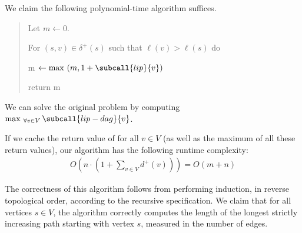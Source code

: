 \documentclass{article}
\begin{document}
\begin{solution}
We claim the following polynomial-time algorithm suffices.

\begin{quote}%


\begin{steps}
  \item Let \( m \leftarrow 0 \).
  \item For \( (s,v)\in \delta^+(s) \) such that \( \ell(v) > \ell(s) \) do
    \begin{steps}
        \item m \( \leftarrow \max \ (m, 1 + \subcall{lip}{v}) \)
    \end{steps}
  \item return m
\end{steps}
\end{quote}

We can solve the original problem by computing \(\max_{ \ \forall v\in V}\subcall{lip-dag}{v}\).

\begin{subproof}[Runtime]
If we cache the return value of  for all \( v \in V \) (as well as the maximum of all these return values), our algorithm has the following runtime complexity:
\begin{align*}
    O \left( n \cdot \left( 1+\sum_{v\in V} d^+(v) \right) \right) = O \left( m+n \right)
\end{align*}


\end{subproof}

\begin{subproof}[Correctness]
The correctness of this algorithm follows from performing induction, in reverse topological order, according to the recursive specification. We claim that for all vertices \( s \in V \), the algorithm correctly computes the length of the longest strictly increasing path starting with vertex \( s \), measured in the number of edges.


\end{subproof}
\end{solution}
\end{document}
